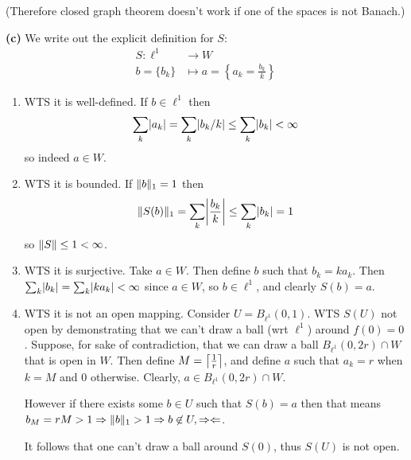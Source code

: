 \documentclass[a4paper, 10pt]{article}
\begin{document}
\begin{solution}
    (Therefore closed graph theorem doesn't work if one of the spaces is not Banach.)

    \textbf{(c)} We write out the explicit definition for $S$: 
    \begin{align*}
    S: \ell^1 &\to W \\
    b = \{b_k\} & \mapsto a = \left\{a_k = \frac{b_k}{k}\right\}
    \end{align*}

    \begin{enumerate} [1.]
    \item WTS it is well-defined. If $b \in \ell^1$ then \begin{equation*}
    \sum_{k} \abs{a_k} = \sum_{k} \abs{b_k/k} \leq \sum_k \abs{b_k} < \infty
    \end{equation*}
    so indeed $a \in W$.
    \item WTS it is bounded. If $\norm{b}_1 = 1$ then \begin{equation*}
    \norm{S(b)}_1 = \sum_{k} \abs*{\frac{b_k}{k}} \leq \sum_{k} \abs{b_k} = 1
    \end{equation*}
    so $\norm{S} \leq 1 < \infty$.

    \item WTS it is surjective. Take $a \in W$. Then define $b$ such that $b_k = ka_k$. Then $\sum_{k} \abs{b_k} = \sum_{k} \abs{ka_k} < \infty$ since $a \in W$, so $b \in \ell^1$, and clearly $S(b) = a$. 
    \item WTS it is not an open mapping. Consider $U = B_{\ell^1}(0, 1)$. WTS $S(U)$ not open by demonstrating that we can't draw a ball (wrt $\ell^1$) around $f(0) = 0$. Suppose, for sake of contradiction, that we can draw a ball $B_{\ell^1}(0, 2r) \cap W$ that is open in $W$. Then define $M = \ceil*{\frac{1}{r}}$, and define $a$ such that $a_k = r$ when $k = M$ and $0$ otherwise. Clearly, $a \in B_{\ell^1}(0, 2r) \cap W$.
    
    However if there exists some $b \in U$ such that $S(b) = a$ then that means $b_M = rM > 1 \implies \norm{b}_1 > 1 \implies b \not \in U, \contra$.

    It follows that one can't draw a ball around $S(0)$, thus $S(U)$ is not open.
\end{enumerate}
\end{solution}
\end{document}
